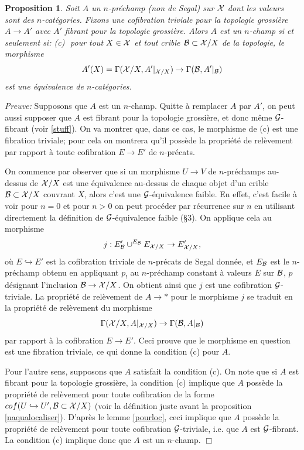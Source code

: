 \documentclass[12pt]{article}
\newcommand{\eop}{\hfill $\Box$\vspace{.1in}}
\newtheorem{proposition}[lemma]{Proposition}
\newcommand{\Gg}{{\cal G}}
\newcommand{\Bb}{{\cal B}}
\newcommand{\Xx}{{\cal X}}
\begin{document}
\begin{proposition}
\label{newcritere}
Soit $A$ un $n$-pr\'echamp (non de Segal) sur $\Xx$ dont les valeurs sont
des $n$-cat\'egories. Fixons une cofibration triviale pour la
topologie grossi\`ere $A\rightarrow A'$ avec $A'$ fibrant pour la topologie
grossi\`ere.
Alors $A$ est un $n$-champ si et seulement si:
\newline
(c)\,\,
pour tout $X\in \Xx$ et tout crible $\Bb \subset \Xx /X$ de la topologie,
le morphisme
$$
A'(X)=\Gamma (\Xx /X, A'|_{\Xx /X}) \rightarrow \Gamma (\Bb , A'|_{\Bb})
$$
est une \'equivalence de $n$-cat\'egories.
\end{proposition}
{\em Preuve:}
Supposons que $A$ est un $n$-champ. Quitte \`a remplacer
$A$ par $A'$, on peut
aussi supposer que $A$ est fibrant pour la topologie grossi\`ere, et
donc m\^eme
$\Gg$-fibrant (voir \ref{stuff}). On va montrer que, dans ce cas, le
morphisme
de (c) est une fibration triviale; pour cela on montrera qu'il poss\`ede la
propri\'et\'e de rel\`evement par rapport \`a toute cofibration $E\rightarrow
E'$ de $n$-pr\'ecats.

On commence par observer que si un morphisme $U\rightarrow
V$ de $n$-pr\'echamps au-dessus de $\Xx /X$ est une \'equivalence
au-dessus de chaque objet d'un crible $\Bb \subset \Xx /X$ couvrant $X$,
alors c'est
une $\Gg$-\'equivalence faible. En effet, c'est facile \`a voir pour $n=0$
et pour $n>0$ on peut proc\'eder par r\'ecurrence sur $n$ en utilisant
directement
la d\'efinition de $\Gg$-\'equivalence faible (\S 3). On applique cela au
morphisme
$$
j:E'_{\Bb} \cup ^{E_{\Bb}} E_{\Xx /X} \rightarrow E'_{\Xx /X},
$$
o\`u $E\hookrightarrow E'$ est la cofibration triviale de $n$-pr\'ecats de
Segal donn\'ee, et $E_{\Bb}$ est le
$n$-pr\'echamp obtenu en appliquant $p_{!}$ au $n$-pr\'echamp
constant \`a valeurs $E$ sur $\Bb$, $p$ d\'esignant
l'inclusion $\Bb \rightarrow \Xx /X$.
On obtient ainsi que $j$ est une cofibration $\Gg$-triviale. La propri\'et\'e de
rel\`evement de $A\rightarrow \ast$ pour le morphisme $j$ se traduit en la
propri\'et\'e de rel\`evement du morphisme
$$
\Gamma (\Xx /X, A|_{\Xx /X}) \rightarrow \Gamma (\Bb , A|_{\Bb})
$$
par rapport \`a la cofibration $E\rightarrow E'$. Ceci prouve que le morphisme
en question est une fibration triviale, ce qui donne la condition (c) pour $A$.

Pour l'autre sens, supposons que $A$ satisfait la condition (c).
On note que si
$A$ est fibrant pour la topologie grossi\`ere, la condition (c) implique
que $A$
poss\`ede la
propri\'et\'e de rel\`evement pour toute cofibration de la forme
$cof(U\hookrightarrow U', \Bb \subset \Xx /X)$ (voir la d\'efinition juste avant
la proposition \ref{naqualocaliser}).  D'apr\`es le
lemme \ref{pourloc}, ceci implique
que $A$ poss\`ede la propri\'et\'e de rel\`evement pour toute cofibration
$\Gg$-triviale, i.e. que $A$ est $\Gg$-fibrant. La condition (c)
implique donc que $A$
est un $n$-champ.
\eop
\end{document}
